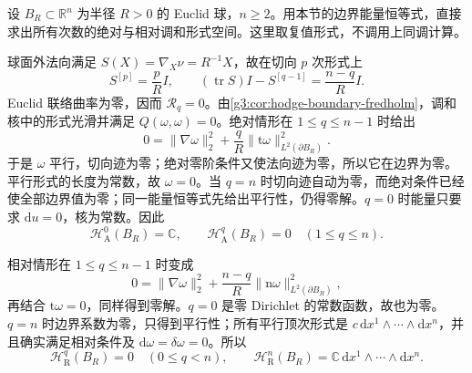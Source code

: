\begin{exercise}\label{g3:ex:ball-absolute-relative-harmonics}
	设 \(B_R\subset\mathbb R^n\) 为半径 \(R>0\) 的 Euclid 球，\(n\ge2\)。用本节的边界能量恒等式，直接求出所有次数的绝对与相对调和形式空间。这里取复值形式，不调用上同调计算。
\end{exercise}
\begin{solution}
	球面外法向满足 \(S(X)=\nabla_X\nu=R^{-1}X\)，故在切向 \(p\) 次形式上
	\[
		S^{[p]}=\frac pR I,\qquad
		(\operatorname{tr}S)I-S^{[q-1]}=\frac{n-q}{R}I.
	\]
	Euclid 联络曲率为零，因而 \(\mathcal R_q=0\)。由\cref{g3:cor:hodge-boundary-fredholm}，调和核中的形式光滑并满足 \(Q(\omega,\omega)=0\)。绝对情形在 \(1\le q\le n-1\) 时给出
	\[
		0=\|\nabla\omega\|_2^2
		+\frac qR\|\mathrm t\omega\|_{L^2(\partial B_R)}^2.
	\]
	于是 \(\omega\) 平行，切向迹为零；绝对零阶条件又使法向迹为零，所以它在边界为零。平行形式的长度为常数，故 \(\omega=0\)。当 \(q=n\) 时切向迹自动为零，而绝对条件已经使全部边界值为零；同一能量恒等式先给出平行性，仍得零解。\(q=0\) 时能量只要求 \(\mathrm du=0\)，核为常数。因此
	\[
		\mathcal H_{\mathrm A}^0(B_R)=\mathbb C,
		\qquad \mathcal H_{\mathrm A}^q(B_R)=0\quad(1\le q\le n).
	\]

	相对情形在 \(1\le q\le n-1\) 时变成
	\[
		0=\|\nabla\omega\|_2^2
		+\frac{n-q}{R}\|\mathrm n\omega\|_{L^2(\partial B_R)}^2,
	\]
	再结合 \(\mathrm t\omega=0\)，同样得到零解。\(q=0\) 是零 Dirichlet 的常数函数，故也为零。\(q=n\) 时边界系数为零，只得到平行性；所有平行顶次形式是 \(c\,\mathrm dx^1\wedge\cdots\wedge\mathrm dx^n\)，并且确实满足相对条件及 \(\mathrm d\omega=\delta\omega=0\)。所以
	\[
		\mathcal H_{\mathrm R}^q(B_R)=0\quad(0\le q<n),\qquad
		\mathcal H_{\mathrm R}^n(B_R)
		=\mathbb C\,\mathrm dx^1\wedge\cdots\wedge\mathrm dx^n.
	\]
\end{solution}

